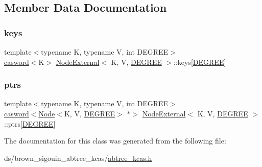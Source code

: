 \subsection{Member Data Documentation}
\mbox{\label{classNodeExternal_a1dec7089d1064805e384ded0dcf2b093}} 
\subsubsection{\texorpdfstring{keys}{keys}}
{\footnotesize\ttfamily template$<$typename K, typename V, int D\+E\+G\+R\+EE$>$ \\
\hyperlink{structcasword}{casword}$<$K$>$ \hyperlink{classNodeExternal}{Node\+External}$<$ K, V, \hyperlink{brown__sigouin__abtree__kcas_2adapter_8h_a5d88b17d70c985f2f2b8e987037fd6dd}{D\+E\+G\+R\+EE} $>$\+::keys\mbox{[}\hyperlink{brown__sigouin__abtree__kcas_2adapter_8h_a5d88b17d70c985f2f2b8e987037fd6dd}{D\+E\+G\+R\+EE}\mbox{]}}

\mbox{\label{classNodeExternal_a6996827a5ab11c49bc5e738848e3c2bc}} 
\subsubsection{\texorpdfstring{ptrs}{ptrs}}
{\footnotesize\ttfamily template$<$typename K, typename V, int D\+E\+G\+R\+EE$>$ \\
\hyperlink{structcasword}{casword}$<$\hyperlink{classNode}{Node}$<$K, V, \hyperlink{brown__sigouin__abtree__kcas_2adapter_8h_a5d88b17d70c985f2f2b8e987037fd6dd}{D\+E\+G\+R\+EE}$>$ $\ast$$>$ \hyperlink{classNodeExternal}{Node\+External}$<$ K, V, \hyperlink{brown__sigouin__abtree__kcas_2adapter_8h_a5d88b17d70c985f2f2b8e987037fd6dd}{D\+E\+G\+R\+EE} $>$\+::ptrs\mbox{[}\hyperlink{brown__sigouin__abtree__kcas_2adapter_8h_a5d88b17d70c985f2f2b8e987037fd6dd}{D\+E\+G\+R\+EE}\mbox{]}}



The documentation for this class was generated from the following file\+:\begin{DoxyCompactItemize}
\item 
ds/brown\+\_\+sigouin\+\_\+abtree\+\_\+kcas/\hyperlink{abtree__kcas_8h}{abtree\+\_\+kcas.\+h}\end{DoxyCompactItemize}

